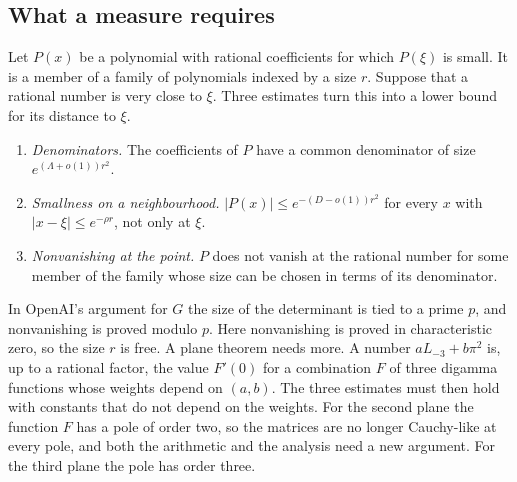 \documentclass[11pt]{amsart}
\theoremstyle{definition}
\theoremstyle{remark}
\numberwithin{equation}{section}
\newcommand{\Lt}{L_{-3}}             %
\begin{document}
\subsection{What a measure requires}
Let $P(x)$ be a polynomial with rational coefficients for which $P(\xi)$ is small. It is a member of a family of
polynomials indexed by a size $r$. Suppose that a rational number is very close to $\xi$. Three estimates turn this
into a lower bound for its distance to $\xi$.
\begin{enumerate}[label=(\roman*)]
\item \emph{Denominators.} The coefficients of $P$ have a common denominator of size $e^{(\Lambda+o(1))r^2}$.
\item \emph{Smallness on a neighbourhood.} $|P(x)|\le e^{-(D-o(1))r^2}$ for every $x$ with $|x-\xi|\le e^{-\rho r}$,
 not only at $\xi$.
\item \emph{Nonvanishing at the point.} $P$ does not vanish at the rational number for some member of the family whose
 size can be chosen in terms of its denominator.
\end{enumerate}
In OpenAI's argument for $G$ the size of the determinant is tied to a prime $p$, and nonvanishing is proved modulo $p$.
Here nonvanishing is proved in characteristic zero, so the size $r$ is free. A plane theorem needs more. A number
$a\Lt+b\pi^2$ is, up to a rational factor, the value $F'(0)$ for a combination $F$ of three digamma functions whose
weights depend on $(a,b)$. The three estimates must then hold with constants that do not depend on the weights. For
the second plane the function $F$ has a pole of order two, so the matrices are no longer Cauchy-like at every pole,
and both the arithmetic and the analysis need a new argument. For the third plane the pole has order three.
\end{document}
